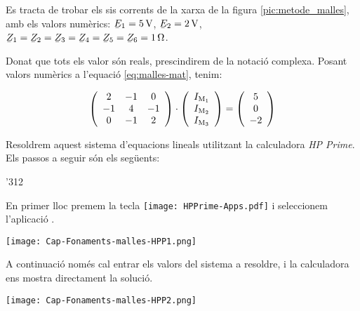 \begin{exemple}\label{ex:malles}
    Es tracta de trobar els sis corrents de la xarxa de la figura \vref{pic:metode_malles}, amb els valors numèrics: $\cmplx{E}_1=\SI{5}{V}$, $\cmplx{E}_2=\SI{2}{V}$, $\cmplx{Z}_1=\cmplx{Z}_2=\cmplx{Z}_3=\cmplx{Z}_4=\cmplx{Z}_5=\cmplx{Z}_6=\SI{1}{\ohm}$.

    Donat que tots els valor són reals, prescindirem de la notació complexa. Posant valors numèrics a l'equació \eqref{eq:malles-mat}, tenim:

    \[
      \left(
        \begin{array}{ccc}
          2 & -1 &  0 \\
         -1 &  4 & -1 \\
          0 &  -1 & 2 \\
        \end{array}
      \right)
      \cdot
      \left(
          \begin{array}{c}
            I_\mathrm{M_1} \\
            I_\mathrm{M_2} \\
            I_\mathrm{M_3} \\
          \end{array}
      \right)
      =
      \left(
          \begin{array}{c}
            5 \\
            0 \\
            -2 \\
          \end{array}
      \right)
    \]

    Resoldrem aquest sistema d'equacions lineals utilitzant la calculadora \emph{HP Prime}. Els passos a seguir són els següents:

    \begin{dingautolist}{'312}
     \item En primer lloc premem la tecla \texttt{[image: HPPrime-Apps.pdf]} i seleccionem l'aplicació .

         \texttt{[image: Cap-Fonaments-malles-HPP1.png]}
    \item A continuació només cal entrar els valors del sistema a resoldre, i la calculadora ens mostra directament la solució.

         \texttt{[image: Cap-Fonaments-malles-HPP2.png]}
    \end{dingautolist}


\end{exemple}

